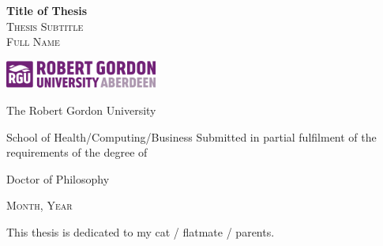 \documentclass[11pt, a4paper, twoside, onecolumn, final]{memoir}
\begin{document}
\openleft
	
\frontmatter

  
  {
  \thispagestyle{empty}
	\centering
	\vspace*{0.08\textheight}
	{\Huge\bfseries Title of Thesis}\\[\baselineskip]
	{\Large\scshape Thesis Subtitle}\\[\baselineskip]
	\vfill
	{\large\scshape Full Name}\par
	\vfill
		{\centering\includegraphics[width = 50mm]{images/rgu_logo.png}} \par
	The Robert Gordon University \par
	School of Health/Computing/Business
	\vfill
	Submitted in partial fulfilment of the requirements of the degree of \par
	Doctor of Philosophy \par
	\vfill
	{\scshape Month, Year}\par
	\vfill
  }
  
	
  \pagestyle{plain}
  
  \cleardoublepage
  
		
    
    \openright
		
		\begin{center}
			\vspace*{7.5cm}
			This thesis is dedicated to my cat / flatmate / parents.
		\end{center}
	
		
		\cleardoublepage
	
		\vspace*{-2.5cm}
		\tableofcontents
		\clearpage
	
	
\end{document}

